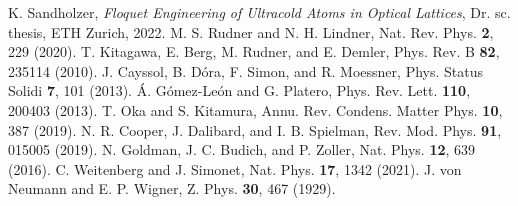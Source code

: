 \documentclass[reprint, amsmath, amssymb, aps]{revtex4-2}
\begin{document}
\begin{thebibliography}{9}
K. Sandholzer, \textit{Floquet Engineering of Ultracold Atoms in Optical Lattices}, Dr. sc. thesis, ETH Zurich, 2022.
M. S. Rudner and N. H. Lindner, Nat. Rev. Phys. \textbf{2}, 229 (2020).
T. Kitagawa, E. Berg, M. Rudner, and E. Demler, Phys. Rev. B \textbf{82}, 235114 (2010).
J. Cayssol, B. Dóra, F. Simon, and R. Moessner, Phys. Status Solidi \textbf{7}, 101 (2013).
Á. Gómez-León and G. Platero, Phys. Rev. Lett. \textbf{110}, 200403 (2013).
T. Oka and S. Kitamura, Annu. Rev. Condens. Matter Phys. \textbf{10}, 387 (2019).
N. R. Cooper, J. Dalibard, and I. B. Spielman, Rev. Mod. Phys. \textbf{91}, 015005 (2019).
N. Goldman, J. C. Budich, and P. Zoller,  Nat. Phys. \textbf{12}, 639 (2016).
C. Weitenberg and J. Simonet, Nat. Phys. \textbf{17}, 1342 (2021).
J. von Neumann and E. P. Wigner, Z. Phys. \textbf{30}, 467 (1929).
\end{thebibliography}
\end{document}
